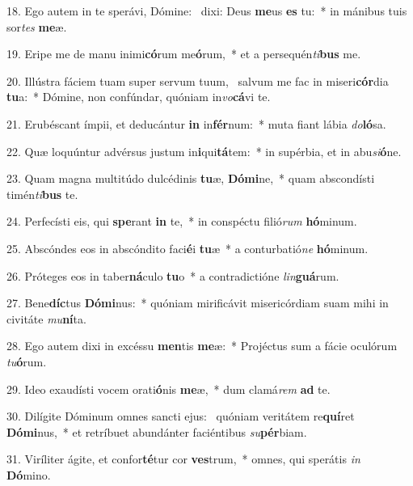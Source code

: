 18. Ego autem in te sperávi, Dómine: \dag\  dixi: Deus \textbf{me}us \textbf{es} tu:~*  in mánibus tuis sor\textit{tes} \textbf{me}æ.\

19. Eripe me de manu inimi\textbf{có}rum me\textbf{ó}rum,~*  et a persequén\textit{ti}\textbf{bus} me.\

20. Illústra fáciem tuam super servum tuum, \dag\  salvum me fac in miseri\textbf{cór}dia \textbf{tu}a:~*  Dómine, non confúndar, quóniam in\textit{vo}\textbf{cá}vi te.\

21. Erubéscant ímpii, et deducántur \textbf{in} in\textbf{fér}num:~*  muta fiant lábia \textit{do}\textbf{ló}sa.\

22. Quæ loquúntur advérsus justum in\textbf{i}qui\textbf{tá}tem:~*  in supérbia, et in abu\textit{si}\textbf{ó}ne.\

23. Quam magna multitúdo dulcédinis \textbf{tu}æ, \textbf{Dó}\textbf{mi}ne,~*  quam abscondísti timén\textit{ti}\textbf{bus} te.\

24. Perfecísti eis, qui \textbf{spe}rant \textbf{in} te,~*  in conspéctu filió\textit{rum} \textbf{hó}minum.\

25. Abscóndes eos in abscóndito faci\textbf{é}i \textbf{tu}æ~*  a conturbatió\textit{ne} \textbf{hó}minum.\

26. Próteges eos in taber\textbf{ná}culo \textbf{tu}o~*  a contradictióne \textit{lin}\textbf{guá}rum.\

27. Bene\textbf{díc}tus \textbf{Dó}\textbf{mi}nus:~*  quóniam mirificávit misericórdiam suam mihi in civitáte \textit{mu}\textbf{ní}ta.\

28. Ego autem dixi in excéssu \textbf{men}tis \textbf{me}æ:~*  Projéctus sum a fácie oculórum \textit{tu}\textbf{ó}rum.\

29. Ideo exaudísti vocem orati\textbf{ó}nis \textbf{me}æ,~*  dum clamá\textit{rem} \textbf{ad} te.\

30. Dilígite Dóminum omnes sancti ejus: \dag\  quóniam veritátem re\textbf{quí}ret \textbf{Dó}\textbf{mi}nus,~*  et retríbuet abundánter faciéntibus \textit{su}\textbf{pér}biam.\

31. Viríliter ágite, et confor\textbf{té}tur cor \textbf{ves}trum,~*  omnes, qui sperátis \textit{in} \textbf{Dó}mino.\

